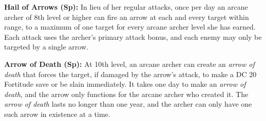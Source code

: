\textbf{Hail of Arrows (Sp):} In lieu of her regular attacks, 
once per day an arcane archer of 8th level or higher can fire an arrow at each 
and every target within range, to a maximum of one target for every arcane archer 
level she has earned. Each attack uses the archer's primary attack bonus, and each 
enemy may only be targeted by a single arrow.

\textbf{Arrow of Death (Sp):} At 10th level, an arcane archer 
can create an \textit{arrow of death} that forces the target, if damaged by the 
arrow's attack, to make a DC 20 Fortitude save or be slain immediately. It takes 
one day to make an \textit{arrow of death}, and the arrow only functions for the 
arcane archer who created it. The \textit{arrow of death} lasts no longer than 
one year, and the archer can only have one such arrow in existence at a time.
